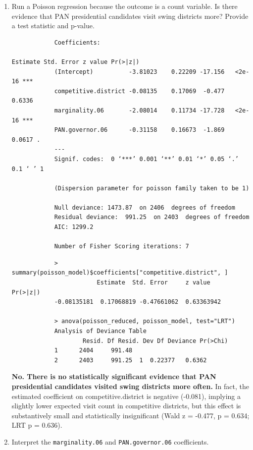 \documentclass[12pt,letterpaper]{article}
\begin{document}
	\begin{enumerate}
		\item [(a)]
		Run a Poisson regression because the outcome is a count variable. Is there evidence that PAN presidential candidates visit swing districts more? Provide a test statistic and p-value.
		
		
		
		\begin{verbatim}
			Coefficients:
																								Estimate Std. Error z value Pr(>|z|)    
			(Intercept)          -3.81023    0.22209 -17.156   <2e-16 ***
			competitive.district -0.08135    0.17069  -0.477   0.6336    
			marginality.06       -2.08014    0.11734 -17.728   <2e-16 ***
			PAN.governor.06      -0.31158    0.16673  -1.869   0.0617 .  
			---
			Signif. codes:  0 ‘***’ 0.001 ‘**’ 0.01 ‘*’ 0.05 ‘.’ 0.1 ‘ ’ 1
			
			(Dispersion parameter for poisson family taken to be 1)
			
			Null deviance: 1473.87  on 2406  degrees of freedom
			Residual deviance:  991.25  on 2403  degrees of freedom
			AIC: 1299.2
			
			Number of Fisher Scoring iterations: 7
		\end{verbatim}
		
		\begin{verbatim}
			> summary(poisson_model)$coefficients["competitive.district", ]
						Estimate  Std. Error     z value    Pr(>|z|) 
			-0.08135181  0.17068819 -0.47661062  0.63363942 
			
			> anova(poisson_reduced, poisson_model, test="LRT")
			Analysis of Deviance Table
					Resid. Df Resid. Dev Df Deviance Pr(>Chi)
			1      2404     991.48                     
			2      2403     991.25  1  0.22377   0.6362
		\end{verbatim}
		
		\vspace{0.2cm}
		\textbf{No. There is no statistically significant evidence that PAN presidential candidates visited swing districts more often.} In fact, the estimated coefficient on competitive.district is negative (-0.081), implying a slightly lower expected visit count in competitive districts, but this effect is substantively small and statistically insignificant (Wald z = -0.477, p = 0.634; LRT p = 0.636).
		
		\item [(b)]
		Interpret the \texttt{marginality.06} and \texttt{PAN.governor.06} coefficients.
		

\end{enumerate}
\end{document}
